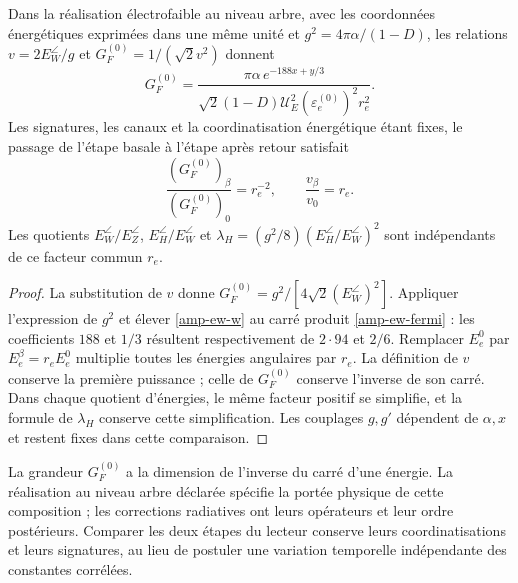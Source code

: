 \begin{proposition}
Dans la réalisation électrofaible au niveau arbre, avec les coordonnées énergétiques
exprimées dans une même unité et $g^2=4\pi\alpha/(1-D)$, les relations
$v=2E_W^\angle/g$ et $G_F^{(0)}=1/(\sqrt2v^2)$ donnent
\begin{equation}
 G_F^{(0)}=
 \frac{\pi\alpha\,e^{-188x+y/3}}
 {\sqrt2(1-D)\mathcal U_E^2(\varepsilon_e^{(0)})^2r_e^2}.
 \label{amp-ew-fermi}
\end{equation}
Les signatures, les canaux et la coordinatisation énergétique étant fixes, le passage de
l’étape basale à l’étape après retour satisfait
\begin{equation}
 \frac{(G_F^{(0)})_\beta}{(G_F^{(0)})_0}=r_e^{-2},\qquad
 \frac{v_\beta}{v_0}=r_e.
 \label{amp-ew-escala}
\end{equation}
Les quotients $E_W^\angle/E_Z^\angle$, $E_H^\angle/E_W^\angle$ et
$\lambda_H=(g^2/8)(E_H^\angle/E_W^\angle)^2$ sont indépendants de
ce facteur commun $r_e$.
\end{proposition}
\begin{proof}
La substitution de $v$ donne $G_F^{(0)}=g^2/[4\sqrt2(E_W^\angle)^2]$.
Appliquer l’expression de $g^2$ et élever \eqref{amp-ew-w} au carré
produit \eqref{amp-ew-fermi} : les coefficients $188$ et $1/3$ résultent
respectivement de $2\cdot94$ et $2/6$. Remplacer $E_e^0$ par
$E_e^\beta=r_eE_e^0$ multiplie toutes les énergies angulaires par $r_e$.
La définition de $v$ conserve la première puissance ; celle de $G_F^{(0)}$
conserve l’inverse de son carré. Dans chaque quotient d’énergies, le
même facteur positif se simplifie, et la formule de $\lambda_H$ conserve
cette simplification. Les couplages $g,g'$ dépendent de $\alpha,x$ et
restent fixes dans cette comparaison.
\end{proof}

La grandeur $G_F^{(0)}$ a la dimension de l’inverse du carré d’une énergie.
La réalisation au niveau arbre déclarée spécifie la portée physique de cette
composition ; les corrections radiatives ont leurs opérateurs et leur ordre
postérieurs. Comparer les deux étapes du lecteur conserve leurs coordinatisations et
leurs signatures, au lieu de postuler une variation temporelle indépendante des
constantes corrélées.


